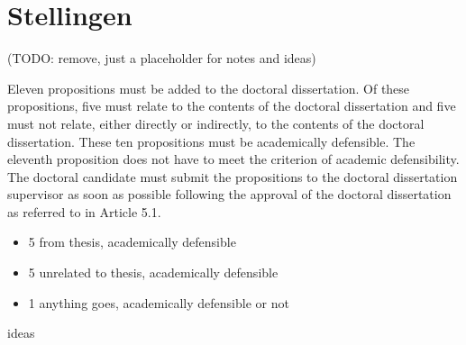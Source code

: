 \chapter*{Stellingen}

(TODO: remove, just a placeholder for notes and ideas)


Eleven propositions must be added to the doctoral dissertation. Of these propositions,
five must relate to the contents of the doctoral dissertation and five must not relate,
either directly or indirectly, to the contents of the doctoral dissertation. These ten
propositions must be academically defensible. The eleventh proposition does not have
to meet the criterion of academic defensibility. The doctoral candidate must submit the
propositions to the doctoral dissertation supervisor as soon as possible following the
approval of the doctoral dissertation as referred to in Article 5.1.

\begin{itemize}
\item 5 from thesis, academically defensible
\item 5 unrelated to thesis, academically defensible
\item 1 anything goes, academically defensible or not
\end{itemize}

ideas

